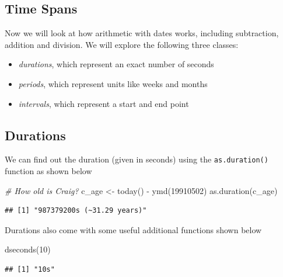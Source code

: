 \documentclass[
]{book}
\newenvironment{Shaded}{\begin{snugshade}}{\end{snugshade}}
\newcommand{\CommentTok}[1]{\textcolor[rgb]{0.56,0.35,0.01}{\textit{#1}}}
\newcommand{\DecValTok}[1]{\textcolor[rgb]{0.00,0.00,0.81}{#1}}
\newcommand{\FunctionTok}[1]{\textcolor[rgb]{0.00,0.00,0.00}{#1}}
\newcommand{\NormalTok}[1]{#1}
\newcommand{\OtherTok}[1]{\textcolor[rgb]{0.56,0.35,0.01}{#1}}
\newcommand{\SpecialCharTok}[1]{\textcolor[rgb]{0.00,0.00,0.00}{#1}}
\providecommand{\tightlist}{%
  \setlength{\itemsep}{0pt}\setlength{\parskip}{0pt}}
\begin{document}
\hypertarget{time-spans}{%
\subsection{Time Spans}\label{time-spans}}

Now we will look at how arithmetic with dates works, including subtraction, addition and division. We will explore the following three classes:

\begin{itemize}
\tightlist
\item
  \emph{durations}, which represent an exact number of seconds
\item
  \emph{periods}, which represent units like weeks and months
\item
  \emph{intervals}, which represent a start and end point
\end{itemize}

\hypertarget{durations}{%
\subsection{Durations}\label{durations}}

We can find out the duration (given in seconds) using the \texttt{as.duration()} function as shown below

\begin{Shaded}
\begin{Highlighting}[]
\CommentTok{\# How old is Craig?}
\NormalTok{c\_age }\OtherTok{\textless{}{-}} \FunctionTok{today}\NormalTok{() }\SpecialCharTok{{-}} \FunctionTok{ymd}\NormalTok{(}\DecValTok{19910502}\NormalTok{)}
\FunctionTok{as.duration}\NormalTok{(c\_age)}
\end{Highlighting}
\end{Shaded}

\begin{verbatim}
## [1] "987379200s (~31.29 years)"
\end{verbatim}

Durations also come with some useful additional functions shown below

\begin{Shaded}
\begin{Highlighting}[]
\FunctionTok{dseconds}\NormalTok{(}\DecValTok{10}\NormalTok{)}
\end{Highlighting}
\end{Shaded}

\begin{verbatim}
## [1] "10s"
\end{verbatim}
\end{document}
